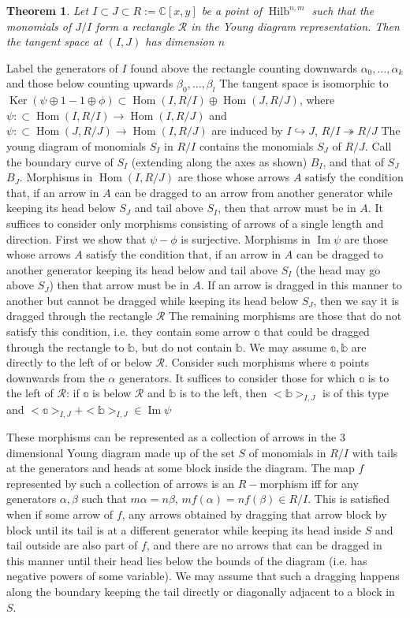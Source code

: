 \documentclass[a4paper,12pt,titlepage]{article}
\newcommand{\C}{\mathbb{C}}
\DeclareMathOperator{\Ker}{Ker}
\DeclareMathOperator{\im}{Im}
\DeclareMathOperator{\Hom}{Hom}
\DeclareMathOperator{\Hilb}{Hilb}
\newtheorem{thm}{Theorem}
\begin{document}
\begin{thm} Let $I \subset J \subset R := \C[x,y]$ be a point of $\Hilb^{n,m}$ such that the monomials of $J/I$ form a rectangle $\mathcal R$ in the Young diagram representation. Then the tangent space at $(I,J)$ has dimension $n$
\end{thm}
Label the generators of $I$ found above the rectangle counting downwards $\alpha_0, \dots, \alpha_k$ and those below counting upwards $\beta_0, \dots, \beta_l$
The tangent space is isomorphic to $\Ker (\psi \oplus 1 - 1 \oplus \phi) \subset \Hom(I,R/I)\oplus \Hom(J,R/J)$, where $\psi : \subset \Hom(I,R/I) \to \Hom(I,R/J)$ and $\psi : \subset \Hom(J,R/J) \to \Hom(I,R/J)$
are induced by $I \hookrightarrow J$, $R/I \twoheadrightarrow R/J$
The young diagram of monomials $S_I$ in $R/I$ contains the monomials $S_J$ of $R/J$. Call the boundary curve of $S_I$ (extending along the axes as shown) $B_I$, and that of $S_J$ $B_J$. 
Morphisms in $\Hom(I,R/J)$ are those whose arrows $A$ satisfy the condition that, if an arrow in $A$ can be dragged to an arrow from another generator while keeping its head below $S_J$ and tail above $S_I$,
then that arrow must be in $A$.
It suffices to consider only morphisms consisting of arrows of a single length and direction.
First we show that $\psi-\phi$ is surjective. Morphisms in $\im \psi$ are those whose arrows $A$ satisfy the condition that,
if an arrow in $A$ can be dragged to another generator keeping its head below and tail above $S_I$ (the head may go above $S_J$) then that arrow must be in $A$.
If an arrow is dragged in this manner to another but cannot be dragged while keeping its head below $S_J$, then we say it is dragged through the rectangle $\mathcal R$
The remaining morphisms are those that do not satisfy this condition, i.e. they contain some arrow $\mathbb a$ that could be dragged through the rectangle to $\mathbb b$, but do not contain $\mathbb b$.
We may assume $\mathbb a, \mathbb b$ are directly to the left of or below $\mathcal R$.
Consider such morphisms where $\mathbb a$ points downwards from the $\alpha$ generators. It suffices to consider those for which $\mathbb a$ is to the left of $\mathcal R$:
if $\mathbb a$ is below $\mathcal R$ and $\mathbb b$ is to the left, then $<\mathbb b>_{I,J}$ is of this type and $<\mathbb a>_{I,J}+<\mathbb b>_{I,J} \in \im \psi$




These morphisms can be represented as a collection of arrows in the 3 dimensional Young diagram made up of the set $S$ of monomials in $R/I$
with tails at the generators and heads at some block inside the diagram.
The map $f$ represented by such a collection of arrows is an $R-$morphism iff for any generators $\alpha,\beta$ such that $m\alpha=n\beta$, $mf(\alpha)=nf(\beta) \in R/I$.
This is satisfied when if some arrow of $f$, any arrows obtained by dragging that arrow block by block until its tail is at a different generator
while keeping its head inside $S$ and tail outside are also part of $f$, and there are no arrows that
can be dragged in this manner until their head lies below the bounds of the diagram (i.e. has negative powers of some variable).
We may assume that such a dragging happens along the boundary keeping the tail directly or diagonally adjacent to a block in $S$.
\end{document}
